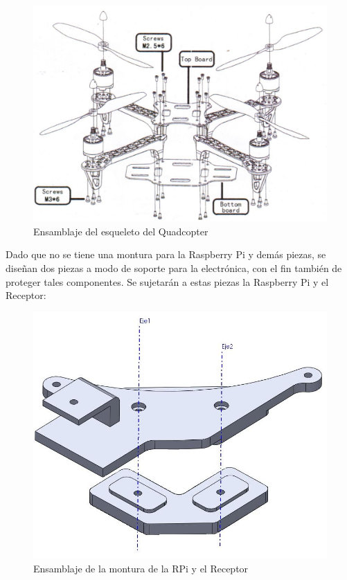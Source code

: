 \documentclass[twoside,11pt]{book}
\begin{document}
\begin{figure}[h!]
\begin{center}
\includegraphics[scale=0.3,bb=0 0 1100 750]{images/frame_mount.png}
\end{center}
\caption{Ensamblaje del esqueleto del Quadcopter}
\end{figure}

Dado que no se tiene una montura para la Raspberry Pi y demás piezas, se diseñan dos piezas a modo de soporte para la electrónica, con el fin también de proteger tales componentes. Se sujetarán a estas piezas la Raspberry Pi y el Receptor: \\

\begin{figure}[h!]
\begin{center}
\includegraphics[scale=0.35,bb=0 0 700 500]{images/ensamblaje_rpi_mount.png}
\end{center}
\caption{Ensamblaje de la montura de la RPi y el Receptor}
\end{figure}
\end{document}
